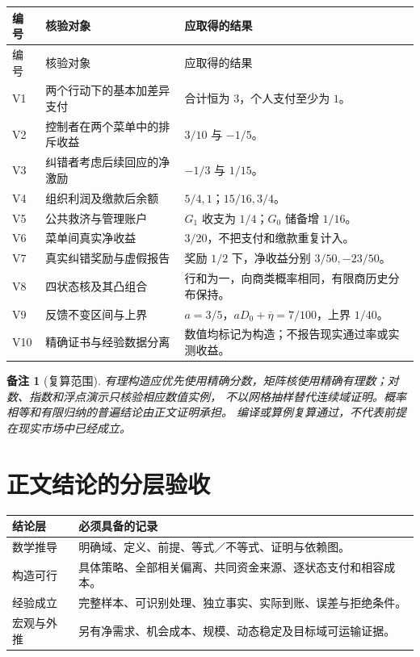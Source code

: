 \documentclass[12pt,a4paper,openany]{report}
\newtheorem{remark}{备注}[chapter]
\begin{document}
\begin{CJK*}{UTF8}{gkai}
\begin{longtable}{L{0.13\textwidth}L{0.44\textwidth}L{0.34\textwidth}}
\toprule 编号 & 核验对象 & 应取得的结果 \\\midrule
\endfirsthead
\toprule 编号 & 核验对象 & 应取得的结果 \\\midrule
\endhead
V1 & 两个行动下的基本加差异支付 & 合计恒为 $3$，个人支付至少为 $1$。\\
V2 & 控制者在两个菜单中的排斥收益 & $3/10$ 与 $-1/5$。\\
V3 & 纠错者考虑后续回应的净激励 & $-1/3$ 与 $1/15$。\\
V4 & 组织利润及缴款后余额 & $5/4,1$；$15/16,3/4$。\\
V5 & 公共救济与管理账户 & $G_1$ 收支为 $1/4$；$G_0$ 储备增 $1/16$。\\
V6 & 菜单间真实净收益 & $3/20$，不把支付和缴款重复计入。\\
V7 & 真实纠错奖励与虚假报告 & 奖励 $1/2$ 下，净收益分别 $3/50,-23/50$。\\
V8 & 四状态核及其凸组合 & 行和为一，向商类概率相同，有限商历史分布保持。\\
V9 & 反馈不变区间与上界 & $a=3/5$，$aD_0+\overline\eta=7/100$，上界 $1/40$。\\
V10 & 精确证书与经验数据分离 & 数值均标记为构造；不报告现实通过率或实测收益。\\
\bottomrule
\end{longtable}

\begin{remark}[复算范围]
有理构造应优先使用精确分数，矩阵核使用精确有理数；对数、指数和浮点演示只核验相应数值实例，
不以网格抽样替代连续域证明。概率相等和有限归纳的普遍结论由正文证明承担。
编译或算例复算通过，不代表前提在现实市场中已经成立。
\end{remark}

\section{正文结论的分层验收}

\begin{center}
\begin{tabular}{L{0.21\textwidth}L{0.69\textwidth}}
\toprule 结论层 & 必须具备的记录 \\\midrule
数学推导 & 明确域、定义、前提、等式／不等式、证明与依赖图。\\
构造可行 & 具体策略、全部相关偏离、共同资金来源、逐状态支付和相容成本。\\
经验成立 & 完整样本、可识别处理、独立事实、实际到账、误差与拒绝条件。\\
宏观与外推 & 另有净需求、机会成本、规模、动态稳定及目标域可运输证据。\\
\bottomrule
\end{tabular}
\end{center}


\end{CJK*}
\end{document}

